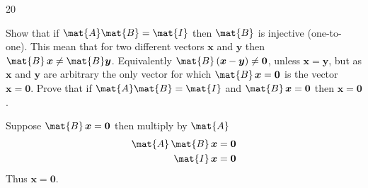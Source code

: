 \documentclass[answers]{sotonExamBoxes}    %
\begin{document}
\begin{question}{20}
\begin{qparts}
{        Show that if $\mat{A}\mat{B}= \mat{I}$ then $\mat{B}$ is
        injective (one-to-one).  This mean that for two different
        vectors $\bm{x}$ and $\bm{y}$ then
        $\mat{B}\, \bm{x} \neq \mat{B} \bm{y}$.  Equivalently
        $\mat{B}\, (\bm{x} - \bm{y}) \neq \bm{0}$, unless $\bm{x}=\bm{y}$,
        but as $\bm{x}$ and $\bm{y}$ are arbitrary the only vector for
        which $\mat{B}\,\bm{x}=\bm{0}$ is the vector $\bm{x}=\bm{0}$.
        Prove that if $\mat{A}\mat{B}= \mat{I}$ and
        $\mat{B}\,\bm{x}=\bm{0}$ then $\bm{x}=\bm{0}$.
      \begin{answer}
        Suppose $\mat{B}\,\bm{x}=\bm{0}$ then multiply by $\mat{A}$
        \begin{align*}
          \mat{A}\, \mat{B}\,\bm{x} &= \bm{0} \\
          \mat{I}\,\bm{x} &= \bm{0}
        \end{align*}
        Thus $\bm{x} = \bm{0}$.
      \end{answer}}{}
    


\end{qparts}
\end{question}
\end{document}
